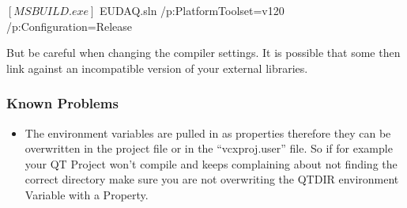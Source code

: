       \begin{listing}[mybash]
$[MSBUILD.exe]$ EUDAQ.sln /p:PlatformToolset=v120 /p:Configuration=Release
\end{listing}

But be careful when changing the compiler settings. It is possible that some then link against an incompatible version of your external libraries. 

\subsubsection{Known Problems}

\begin{itemize}
\item The environment variables are pulled in as properties therefore they can be overwritten in the project file or in the ``vcxproj.user'' file. So if for example your QT Project won't compile and keeps complaining about not finding the correct directory make sure you are not overwriting the QTDIR environment Variable with a Property. 
\end{itemize}
